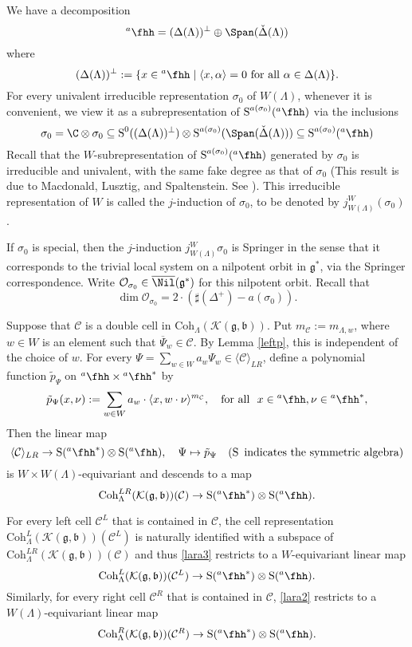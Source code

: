 \documentclass[12pt,a4paper]{amsart}
\def\subset{\subseteq}
\newcommand{\CC}{{\mathcal {C}}}
\newcommand{\CK}{{\mathcal {K}}}
\newcommand{\CO}{{\mathcal {O}}}
\newcommand{\oS}{\operatorname{S}}
\newcommand{\g}{\mathfrak g}
\renewcommand{\b}{\mathfrak b}
\newcommand{\la}{\langle}
\newcommand{\ra}{\rangle}
\newcommand{\be}{\begin {equation}}
\newcommand{\ee}{\end {equation}}
\numberwithin{equation}{section}
\theoremstyle{remark}
\def\hha{{}^a\fhh}
\def\Coh{\mathrm{Coh}}
\begin{document}
We have a decomposition
\[
  \hha=(\Delta(\Lambda))^\perp\oplus \Span( \check \Delta(\Lambda))
  \]
where
\[
(\Delta(\Lambda))^\perp:=\{x\in \hha\mid \la x , \alpha \ra=0\textrm{ for all $\alpha\in \Delta(\Lambda)$}\}.
\]
 For every univalent irreducible representation $\sigma_0$ of $W(\Lambda)$, whenever it is convenient, we view it as a subrepresentation of  $\oS^{a(\sigma_0)}(\hha)$ via the inclusions
\[
\sigma_0=  \C\otimes \sigma_0\subset \oS^0((\Delta(\Lambda))^\perp)\otimes \oS^{a(\sigma_0)}(\Span( \check \Delta(\Lambda)))\subset  \oS^{a(\sigma_0)}(\hha)
\]
 Recall that the $W$-subrepresentation of $\oS^{a(\sigma_0)}(\hha)$ generated by $\sigma_0$
is irreducible and univalent, with the same fake degree as that of $\sigma_0$ (This result is due to Macdonald, Lusztig, and Spaltenstein. See \cite[Chapter 11]{Carter}). This irreducible representation of $W$ is called the $j$-induction of $\sigma_0$, to be denoted by $j_{W(\Lambda)}^W(\sigma_0)$.


If  $\sigma_0$ is special, then the $j$-induction $j_{W(\Lambda)}^W \sigma_0$  is Springer in the sense that it corresponds to the trivial local system on a nilpotent orbit in $\g^*$, via the Springer correspondence. Write $\CO_{\sigma_0}\in \overline \Nil(\g^*)$ for this  nilpotent orbit. Recall that
\[
  \dim \CO_{\sigma_0}=2\cdot (\sharp (\Delta^+) - a(\sigma_0)).
\]



Suppose that $\CC$ is a double cell in $\Coh_{\Lambda}( \CK(\g,\b))$.
Put $m_\CC:=m_{\Lambda, w}$, where $w\in W$ is an element such that $\overline \Psi_{w}\in \CC$. By Lemma \ref{leftp},  this is  independent of the choice of $w$.
For every $\Psi=\sum_{w\in W} a_{w} \Psi_{w}\in \la \CC\ra_{LR}$, define a polynomial function $\tilde p_\Psi$ on $\hha\times \hha^*$ by
\be\label{polynomial00}
  \tilde p_{\Psi}(x,\nu):= \sum_{w\in W} a_{w}\cdot  \la x, w \cdot \nu\ra^{m_{\CC}},\quad  \textrm{for all }  \ x\in \hha, \nu\in \hha^*,
\ee
Then the linear map
\be\label{lara}
    \la \CC\ra_{LR}\rightarrow \oS(\hha^*)\otimes \oS(\hha), \quad \Psi\mapsto \tilde p_{\Psi}\quad (\oS\textrm{ indicates the symmetric algebra})
\ee
is $W\times W(\Lambda)$-equivariant  and descends to a  map
\be\label{lara2}
    \Coh^{LR}_{\Lambda}( \CK(\g,\b))( \CC) \rightarrow \oS(\hha^*)\otimes \oS(\hha).%
\ee

For every left cell $\CC^L$ that is contained in $\CC$, the cell representation  $\Coh^{L}_{\Lambda}( \CK(\g,\b))( \CC^L)$ is naturally identified with a subspace of $\Coh^{LR}_{\Lambda}( \CK(\g,\b))( \CC)$ and thus \eqref{lara3} restricts to a  $W$-equivariant linear map
\be\label{lara3}
    \Coh^{L}_{\Lambda}( \CK(\g,\b))( \CC^L) \rightarrow \oS(\hha^*)\otimes \oS(\hha).%
\ee
Similarly, for every right cell $\CC^R$ that is contained in $\CC$, \eqref{lara2} restricts to a  $W(\Lambda)$-equivariant linear map
\be\label{lara4}
    \Coh^{R}_{\Lambda}( \CK(\g,\b))( \CC^R) \rightarrow \oS(\hha^*)\otimes \oS(\hha).%
\ee
\end{document}
